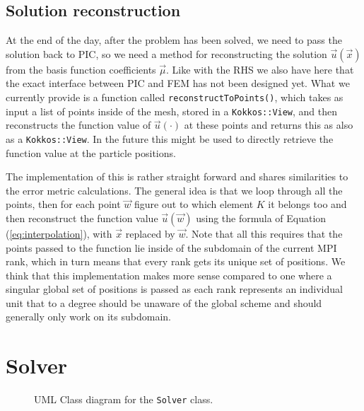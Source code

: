 \subsection{Solution reconstruction}

At the end of the day, after the problem has been solved, we need to pass the solution back to PIC, so we need a method for reconstructing the solution \(\vec u(\vec x)\) from the basis function coefficients \(\vec \mu\). Like with the RHS we also have here that the exact interface between PIC and FEM has not been designed yet. What we currently provide is a function called \texttt{reconstructToPoints()}, which takes as input a list of points inside of the mesh, stored in a \texttt{Kokkos::View}, and then reconstructs the function value of \(\vec u(\cdot)\) at these points and returns this as also as a \texttt{Kokkos::View}. In the future this might be used to directly retrieve the function value at the particle positions.\medskip

The implementation of this is rather straight forward and shares similarities to the error metric calculations. The general idea is that we loop through all the points, then for each point \(\vec w\) figure out to which element \(K\) it belongs too and then reconstruct the function value \(\vec u(\vec w)\) using the formula of Equation (\ref{eq:interpolation}), with \(\vec x\) replaced by \(\vec w\). Note that all this requires that the points passed to the function lie inside of the subdomain of the current MPI rank, which in turn means that every rank gets its unique set of positions. We think that this implementation makes more sense compared to one where a singular global set of positions is passed as each rank represents an individual unit that to a degree should be unaware of the global scheme and should generally only work on its subdomain.

\section{Solver}
\begin{figure}[!h]
    \centering
    
    \caption{UML Class diagram for the \texttt{Solver} class.}
    \label{fig:uml_solver}
\end{figure}

